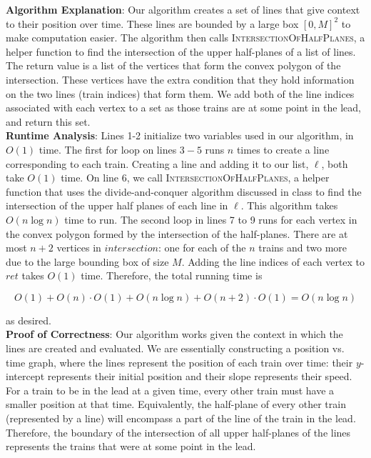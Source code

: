 \documentclass[11pt]{article}
\begin{document}
\begin{enumerate}
\textbf{Algorithm Explanation}: Our algorithm creates a set of lines that give context to their position over time. These lines are bounded by a large box $[0, M]^2$ to make computation easier. The algorithm then calls \textsc{IntersectionOfHalfPlanes}, a helper function to find the intersection of the upper half-planes of a list of lines. The return value is a list of the vertices that form the convex polygon of the intersection. These vertices have the extra condition that they hold information on the two lines (train indices) that form them. We add both of the line indices associated with each vertex to a set as those trains are at some point in the lead, and return this set. \\

\textbf{Runtime Analysis}: Lines 1-2 initialize two variables used in our algorithm, in $O(1)$ time. The first for loop on lines $3-5$ runs $n$ times to create a line corresponding to each train. Creating a line and adding it to our list, $\ell$, both take $O(1)$ time. On line 6, we call \textsc{IntersectionOfHalfPlanes}, a helper function that uses the divide-and-conquer algorithm discussed in class to find the intersection of the upper half planes of each line in $\ell$. This algorithm takes $O(n\log n)$ time to run. The second loop in lines 7 to 9 runs for each vertex in the convex polygon formed by the intersection of the half-planes. There are at most $n+2$ vertices in $intersection$: one for each of the $n$ trains and two more due to the large bounding box of size $M$. Adding the line indices of each vertex to $ret$ takes $O(1)$ time. Therefore, the total running time is

\[O(1) + O(n) \cdot O(1) + O(n\log n) + O(n+2) \cdot O(1) = O(n\log n)\]

as desired. \\

\textbf{Proof of Correctness}: Our algorithm works given the context in which the lines are created and evaluated. We are essentially constructing a position vs. time graph, where the lines represent the position of each train over time: their $y$-intercept represents their initial position and their slope represents their speed. \\

For a train to be in the lead at a given time, every other train must have a smaller position at that time. Equivalently, the half-plane of every other train (represented by a line) will encompass a part of the line of the train in the lead. Therefore, the boundary of the intersection of all upper half-planes of the lines represents the trains that were at some point in the lead. \\


\end{enumerate}
\end{document}
